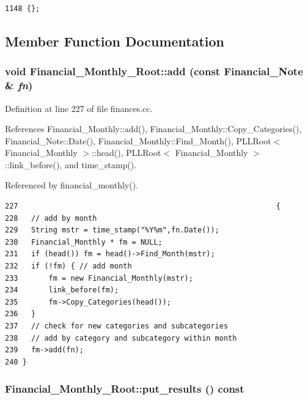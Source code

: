 \footnotesize\begin{verbatim}1148 {};
\end{verbatim}\normalsize 


\subsection{Member Function Documentation}
\subsubsection{\setlength{\rightskip}{0pt plus 5cm}void Financial\_\-Monthly\_\-Root::add (const {\bf Financial\_\-Note} \& {\em fn})}\label{classFinancial__Monthly__Root_a1}




Definition at line 227 of file finances.cc.

References Financial\_\-Monthly::add(), Financial\_\-Monthly::Copy\_\-Categories(), Financial\_\-Note::Date(), Financial\_\-Monthly::Find\_\-Month(), PLLRoot$<$ Financial\_\-Monthly $>$::head(), PLLRoot$<$ Financial\_\-Monthly $>$::link\_\-before(), and time\_\-stamp().

Referenced by financial\_\-monthly().



\footnotesize\begin{verbatim}227                                                           {
228   // add by month
229   String mstr = time_stamp("%Y%m",fn.Date());
230   Financial_Monthly * fm = NULL;
231   if (head()) fm = head()->Find_Month(mstr);
232   if (!fm) { // add month
233       fm = new Financial_Monthly(mstr);
234       link_before(fm);
235       fm->Copy_Categories(head());
236   }
237   // check for new categories and subcategories
238   // add by category and subcategory within month
239   fm->add(fn);
240 }
\end{verbatim}\normalsize 
{}
\subsubsection{ Financial\_\-Monthly\_\-Root::put\_\-results () const}\label{classFinancial__Monthly__Root_a2}





